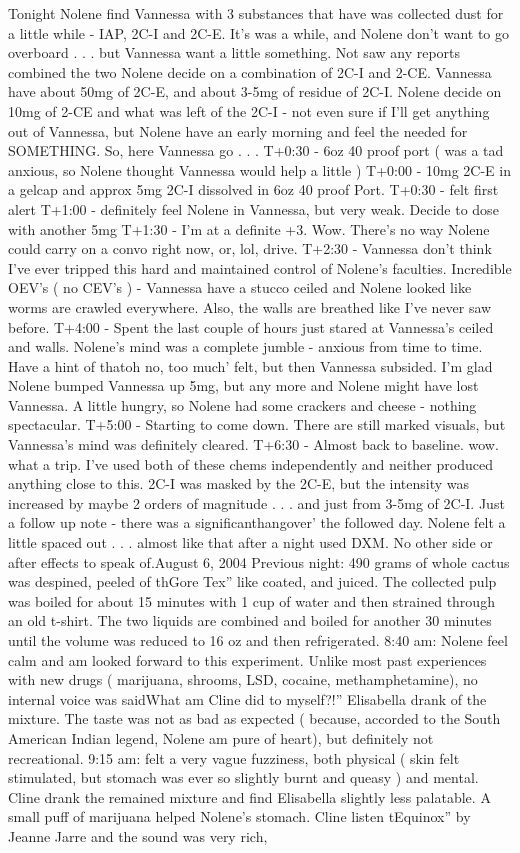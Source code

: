 \documentclass[12pt]{book}
\begin{document}
Tonight Nolene find Vannessa with 3 substances that have was collected dust for a little while - IAP, 2C-I and 2C-E. It's was a while, and Nolene don't want to go overboard . . .  but Vannessa want a little something. Not saw any reports combined the two Nolene decide on a combination of 2C-I and 2-CE. Vannessa have about 50mg of 2C-E, and about 3-5mg of residue of 2C-I. Nolene decide on 10mg of 2-CE and what was left of the 2C-I - not even sure if I'll get anything out of Vannessa, but Nolene have an early morning and feel the needed for SOMETHING. So, here Vannessa go . . .  T+0:30 - 6oz 40 proof port ( was a tad anxious, so Nolene thought Vannessa would help a little ) T+0:00 - 10mg 2C-E in a gelcap and approx 5mg 2C-I dissolved in 6oz 40 proof Port. T+0:30 - felt first alert T+1:00 - definitely feel Nolene in Vannessa, but very weak. Decide to dose with another 5mg T+1:30 - I'm at a definite +3. Wow. There's no way Nolene could carry on a convo right now, or, lol, drive. T+2:30 - Vannessa don't think I've ever tripped this hard and maintained control of Nolene's faculties. Incredible OEV's ( no CEV's ) - Vannessa have a stucco ceiled and Nolene looked like worms are crawled everywhere. Also, the walls are breathed like I've never saw before. T+4:00 - Spent the last couple of hours just stared at Vannessa's ceiled and walls. Nolene's mind was a complete jumble - anxious from time to time. Have a hint of thatoh no, too much' felt, but then Vannessa subsided. I'm glad Nolene bumped Vannessa up 5mg, but any more and Nolene might have lost Vannessa. A little hungry, so Nolene had some crackers and cheese - nothing spectacular. T+5:00 - Starting to come down. There are still marked visuals, but Vannessa's mind was definitely cleared. T+6:30 - Almost back to baseline. wow. what a trip. I've used both of these chems independently and neither produced anything close to this. 2C-I was masked by the 2C-E, but the intensity was increased by maybe 2 orders of magnitude . . .  and just from 3-5mg of 2C-I. Just a follow up note - there was a significanthangover' the followed day. Nolene felt a little spaced out . . .  almost like that after a night used DXM. No other side or after effects to speak of.August 6, 2004 Previous night: 490 grams of whole cactus was despined, peeled of thGore Tex'' like coated, and juiced. The collected pulp was boiled for about 15 minutes with 1 cup of water and then strained through an old t-shirt. The two liquids are combined and boiled for another 30 minutes until the volume was reduced to 16 oz and then refrigerated. 8:40 am: Nolene feel calm and am looked forward to this experiment. Unlike most past experiences with new drugs ( marijuana, shrooms, LSD, cocaine, methamphetamine), no internal voice was saidWhat am Cline did to myself?!'' Elisabella drank  of the mixture. The taste was not as bad as expected ( because, accorded to the South American Indian legend, Nolene am pure of heart), but definitely not recreational. 9:15 am: felt a very vague fuzziness, both physical ( skin felt stimulated, but stomach was ever so slightly burnt and queasy ) and mental. Cline drank the remained mixture and find Elisabella slightly less palatable. A small puff of marijuana helped Nolene's stomach. Cline listen tEquinox'' by Jeanne Jarre and the sound was very rich, 
\end{document}
